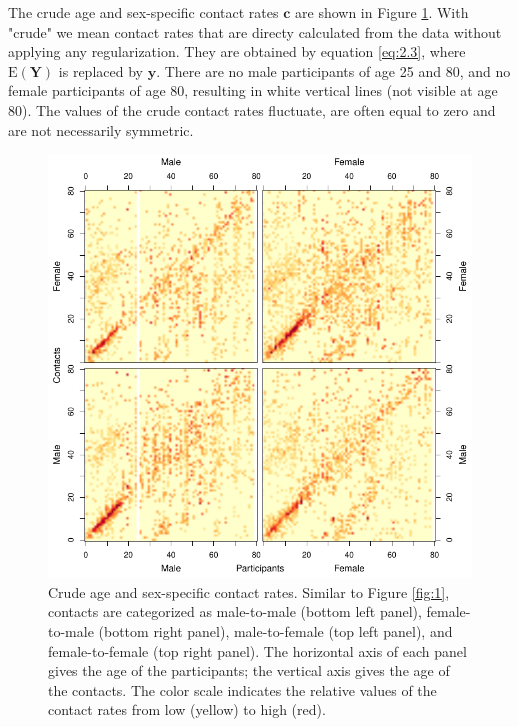 \documentclass[aoas,preprint]{imsart}
\numberwithin{equation}{section}
\begin{document}
The crude age and sex-specific contact rates $\bm{c}$ are shown in Figure \ref{fig:2}. With "crude" we mean contact rates that are directy calculated from the data without applying any regularization. They are obtained by equation \ref{eq:2.3}, where $\text{E}(\bm{Y})$ is replaced by $\bm{y}$. There are no male participants of age 25 and 80, and no female participants of age 80, resulting in white vertical lines (not visible at age 80). The values of the crude contact rates fluctuate, are often equal to zero and are not necessarily symmetric.

\begin{figure}
\centering
\includegraphics{fig_contact_matrix_crude.pdf}
\caption{Crude age and sex-specific contact rates. Similar to Figure \ref{fig:1}, contacts are categorized as male-to-male (bottom left panel), female-to-male (bottom right panel), male-to-female (top left panel), and female-to-female (top right panel). The horizontal axis of each panel gives the age of the participants; the vertical axis gives the age of the contacts. The color scale indicates the relative values of the contact rates from low (yellow) to high (red).} \label{fig:2}
\end{figure}
\end{document}

